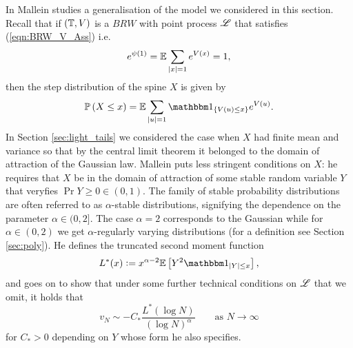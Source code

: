 In \cite[Lemma 4.2]{mallein2018n} Mallein studies a generalisation of the model we considered in this section. Recall that if $(\mathbb{T}, V)$ is a $BRW$ with point process $\mathscr{L}$ that satisfies (\ref{eqn:BRW_V_Ass}) i.e.
\begin{equation}
e^{\psi(1)} = \mathbb{E} \sum\limits_{|x|=1} e^{V(x)} = 1, 
\end{equation}
then the step distribution of the spine $X$ is given by
\begin{equation}
\Pr{X \leq x} = \E \sum\limits_{|u| = 1} \Ind_{\{V(u) \leq x\}} e^{V(u)}. 
\end{equation}
In Section \ref{sec:light_tails} we considered the case when $X$ had finite mean and variance so that by the central limit theorem it belonged to the domain of attraction of the Gaussian law. Mallein puts less stringent conditions on $X$: he requires that $X$ be in the domain of attraction of some stable random variable $Y$ that veryfies $\Pr{Y \geq 0} \in (0, 1)$. The family of stable probability distributions are often referred to as $\alpha$-stable distributions, signifying the dependence on the parameter $\alpha \in (0, 2]$. The case $\alpha = 2$ corresponds to the Gaussian while for $\alpha \in (0, 2)$ we get $\alpha$-regularly varying distributions (for a definition see Section \ref{sec:poly}). He defines the truncated second moment function
\begin{equation}
L^*(x) \defeq x^{\alpha - 2} \Ex{Y^2 \Ind_{|Y| \leq x}}, 
\end{equation}
and goes on to show that under some further technical conditions on $\mathscr{L}$ that we omit, it holds that 
\begin{equation}
v_N \sim - C_* \frac{L^*(\log N)}{(\log N)^\alpha} \qquad\text{as } N \to \infty
\end{equation}
for $C_* > 0$ depending on $Y$ whose form he also specifies. 

\newpage